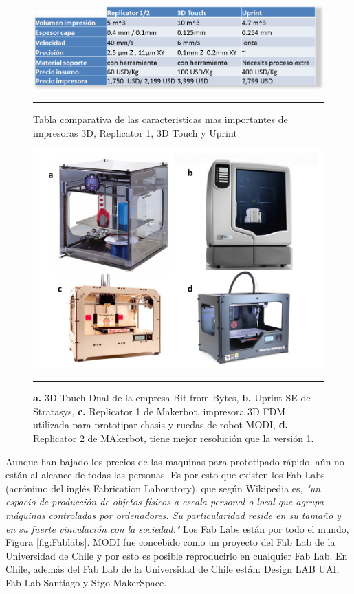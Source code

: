 \begin{figure}[htbp]
	\centering
		\includegraphics[width=\textwidth]{./Figures/tabla_impresoras.png}
		\rule{35em}{0.5pt}
	\caption[Tabla comparativa de impresoras 3D]{Tabla comparativa de las caracteristicas mas importantes de impresoras 3D, Replicator 1, 3D Touch y Uprint}
	\label{fig:TablaImpresoras}
\end{figure}


\begin{figure}[htbp]
	\centering
		\includegraphics[width=\textwidth]{./Figures/impresoras.png}
		\rule{35em}{0.5pt}
	\caption[Impresoras 3D]{\textbf{a.} 3D Touch Dual de la empresa Bit from Bytes, \textbf{b.} Uprint SE de Stratasys, \textbf{c.} Replicator 1 de Makerbot, impresora 3D FDM utilizada para prototipar chasis y ruedas de robot MODI, \textbf{d.} Replicator 2 de MAkerbot, tiene mejor resolución que la versión 1.}
	\label{fig:impresoras}
\end{figure}	


Aunque han bajado los precios de las maquinas para prototipado rápido, aún no están al alcance de todas las personas. Es por esto que existen los Fab Labs (acrónimo del inglés Fabrication Laboratory), que según Wikipedia es, \textit{"un espacio de producción de objetos físicos a escala personal o local que agrupa máquinas controladas por ordenadores. Su particularidad reside en su tamaño y en su fuerte vinculación con la sociedad."} Los Fab Labs están por todo el mundo, Figura \ref{fig:Fablabs}. MODI fue concebido como un proyecto del Fab Lab de la Universidad de Chile y por esto es posible reproducirlo en cualquier Fab Lab. En Chile, además del Fab Lab de la Universidad de Chile están: Design LAB UAI, Fab Lab Santiago y Stgo MakerSpace. 

